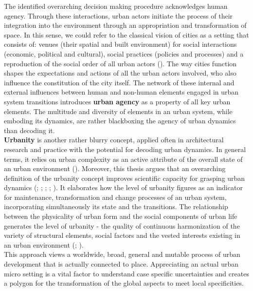 \documentclass[11pt]{report}
\begin{document}
{{The identified overarching decision making procedure acknowledges human agency. Through these interactions, urban actors initiate the process of their integration into the environment through an appropriation and transformation of space. In this sense, we could refer to the classical vision of cities as a setting that consists of: venues (their spatial and built environment) for social interactions (economic, political and cultural), social practices (policies and processes) and a reproduction of the social order of all urban actors (\citealt{firmino_pervasive_2008}). The way cities function shapes the expectations and actions of all the urban actors involved, who also influence the constitution of the city itself. The network of these internal and external influences between human and non-human elements engaged in urban system transitions introduces \textbf{urban agency} as a property of all key urban elements. The multitude and diversity of elements in an urban system, while emboding its dynamics, are rather blackboxing the agency of urban dynamics than decoding it.
\\

\textbf{Urbanity} is another rather blurry concept, applied often in architectural research and practice with the potential for decoding urban dynamics. In general terms, it relies on urban complexity as an active attribute of the overall state of an urban environment (\citealt{canuto_establishing_2012}). 
Moreover, this thesis argues that an overarching definition of the urbanity concept improves scientific capacity for grasping urban dynamics ({\citealt{marcus_spatial_2007}}; \href{ref}{\citealt{zijderveld_theory_2011}}; \href{ref}{\citealt{canuto_establishing_2012}}; \href{ref}{\citealt{de_aguiar_douglas_vieira_what_2013}}; \href{ref}{\citealt{holden_justifying_2015}}).
It elaborates how the level of urbanity figures as an indicator for maintenance, transformation and change processes of an urban system, incorporating simultaneously its state and the transitions.
The relationship between the physicality of urban form and the social components of urban life generates the level of urbanity - the quality of continuous harmonization of the variety of structural elements, social factors and the vested interests existing in an urban environment (\citealt{de_holanda_exceptional_2011}; \citealt{canuto_establishing_2012}). 
\\

This approach views a worldwide, broad, general and mutable process of urban development that is actually connected to place. Appreciating an actual urban micro setting is a vital factor to understand case specific uncertainties and creates a polygon for the transformation of the global aspects to meet local specificities.  

}}
\end{document}
